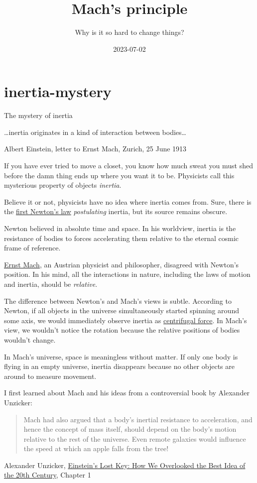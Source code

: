 \documentclass{article}
\title{Mach's principle}
\subtitle{Why is it so hard to change things?}
\date{2023-07-02}
\begin{document}
\section{inertia-mystery}{The mystery of inertia}
\epigraph{
  \ldots inertia originates in a kind of interaction between bodies\ldots
}{
  Albert Einstein, letter to Ernst Mach, Zurich, 25 June 1913
}

If you have ever tried to move a closet, you know how much sweat you must shed before the damn thing ends up where you want it to be.
Physicists call this mysterious property of objects \emph{inertia}.

Believe it or not, physicists have no idea where inertia comes from.
Sure, there is the \href{https://en.wikipedia.org/wiki/Newton's_laws_of_motion}{first Newton's law} \emph{postulating} inertia, but its source remains obscure.

Newton believed in absolute time and space.
In his worldview, inertia is the resistance of bodies to forces accelerating them relative to the eternal cosmic frame of reference.

\href{https://en.wikipedia.org/wiki/Ernst_Mach}{Ernst Mach}, an Austrian physicist and philosopher, disagreed with Newton's position.
In his mind, all the interactions in nature, including the laws of motion and inertia, should be \emph{relative}.


The difference between Newton's and Mach's views is subtle.
According to Newton, if all objects in the universe simultaneously started spinning around some axis, we would immediately observe inertia as \href{https://en.wikipedia.org/wiki/Centrifugal_force}{centrifugal force}.
In Mach's view, we wouldn't notice the rotation because the relative positions of bodies wouldn't change.

In Mach's universe, space is meaningless without matter.
If only one body is flying in an empty universe, inertia disappears because no other objects are around to measure movement.

I first learned about Mach and his ideas from a controversial book by Alexander Unzicker:

\blockquote{
    Mach had also argued that a body's inertial resistance to acceleration, and hence the concept of mass itself, should depend on the body's motion relative to the rest of the universe.
    Even remote galaxies would influence the speed at which an apple falls from the tree!
}{Alexander Unzicker, \href{https://www.amazon.com/Einsteins-Lost-Key-Overlooked-Century/dp/1519473435}{Einstein's Lost Key: How We Overlooked the Best Idea of the 20th Century}, Chapter 1}
\end{document}
